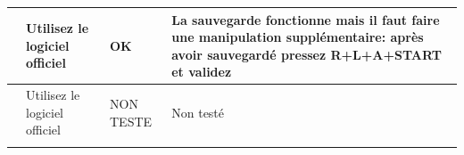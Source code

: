\documentclass[12pt,a4paper]{article}
\begin{document}
    \tablelasttail{\hline}
    \begin{supertabular}{|p{3.5cm}|l|l|l|}
        \hline
            \begin{minipage}[c]{3cm}
            \vspace{0.5cm}
            \end{minipage} & 
            \begin{minipage}{3cm}
            Utilisez le logiciel officiel
            \end{minipage} &
            \begin{minipage}{2cm}
            \textcolor{vert}{OK}
            \end{minipage} &
            \begin{minipage}{7cm}
            La sauvegarde fonctionne mais il faut faire une manipulation supplémentaire: après avoir sauvegardé {\bf pressez R+L+A+START et validez}
            \end{minipage} \\
        \hline
            \begin{minipage}[c]{3cm}
            \vspace{0.5cm}
            \end{minipage} & 
            \begin{minipage}{3cm}
            Utilisez le logiciel officiel 
            \end{minipage} &
            \begin{minipage}{2cm}
            \textcolor{bleu}{NON TESTE}
            \end{minipage} &
            \begin{minipage}{7cm}
            Non testé
            \end{minipage} \\    
        \hline
            \begin{minipage}[c]{3cm}
            \vspace{0.5cm}

\end{minipage}
\end{supertabular}
\end{document}
